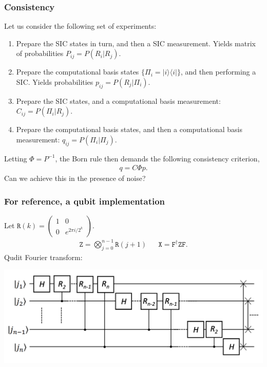 \documentclass{beamer}
\newcommand{\T}[1]{\texttt{#1}}
\begin{document}
\begin{frame}
\frametitle{Consistency}
Let us consider the following set of experiments:
\begin{enumerate}
\item Prepare the SIC states in turn, and then a SIC measurement. Yields matrix of probabilities $P_{ij}=P(R_i|R_j)$.
\item Prepare the computational basis states $\{\Pi_i=|i\rangle\langle i|\}$, and then performing a SIC. Yields probabilities $p_{ij} = P(R_j|\Pi_i)$.
\item Prepare the SIC states, and a computational basis measurement: $C_{ij}=P(\Pi_i|R_j)$.
\item Prepare the computational basis states, and then a computational basis measurement: $q_{ij}=P(\Pi_i|\Pi_j)$.
\end{enumerate}
	Letting $\Phi=P^{-1}$, the Born rule then demands the following consistency criterion,
\begin{align}
q = C\Phi p.	
\end{align}
Can we achieve this in the presence of noise?
\end{frame}


\begin{frame}
\frametitle{For reference, a qubit implementation}
	Let $\T{R}(k) = \begin{pmatrix}1 & 0 \\ 0 & e^{2\pi i/2^k} \end{pmatrix}$.
	\begin{align}
\T{Z}= \bigotimes_{j=0}^{n-1} \T{R}(j+1) && \T{X}=\T{F}^\dagger \T{Z}\T{F}.
\end{align}
Qudit Fourier transform:
\begin{center}
\includegraphics[scale=0.45]{img/qft.png}
\end{center}
\end{frame}
\end{document}

